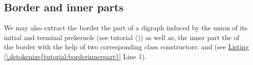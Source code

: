 \documentclass[a4paper,12pt,english]{sphinxhowto}
\begin{document}
\subsection{Border and inner parts}
\label{\detokenize{tutorial:border-and-inner-parts}}
We may also extract the border \sphinxhyphen{}the part of a digraph induced by the union of its initial and terminal prekernels (see tutorial {\hyperref[\detokenize{tutorial:kernel-tutorial-label}]{}} ())\sphinxhyphen{}  as well as, the inner part \sphinxhyphen{}the  of the border\sphinxhyphen{} with the help of two corresponding class constructors:  and  (see \hyperref[\detokenize{tutorial:borderinnerpart}]{Listing \ref{\detokenize{tutorial:borderinnerpart}}}  Line 1).
\end{document}
